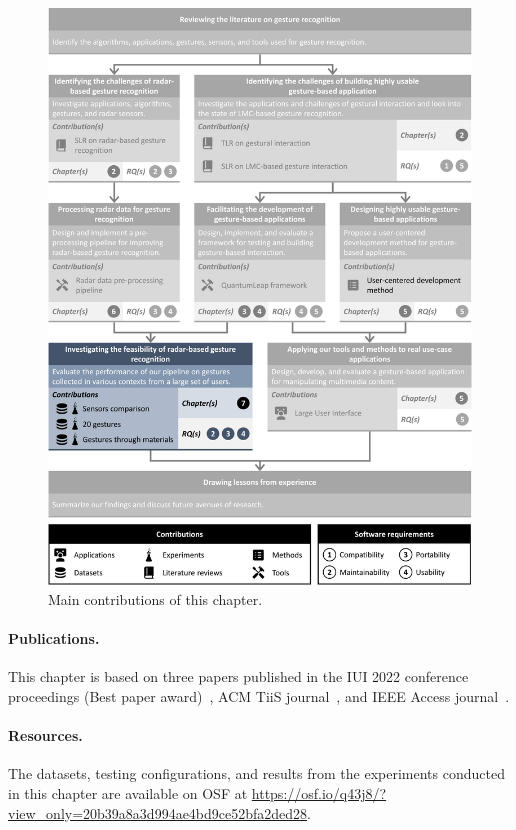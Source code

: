 \begin{figure}
    \centering
    \includegraphics[width=\linewidth]{Figures/RadarExperiments/graphical-summary-radar-experiments.pdf}
    \vspace{-18pt}
    \caption{Main contributions of this chapter.}
    \label{fig:radar-experiments:graphical-summary}
  \end{figure}

\paragraph{Publications.} This chapter is based on three papers published in the IUI 2022 conference proceedings (Best paper award)~\cite{Sluyters:2022:IUI}, ACM TiiS journal~\cite{Sluyters:2023}, and IEEE Access journal~\cite{Sluyters:2024}.

\paragraph{Resources.} The datasets, testing configurations, and results from the experiments conducted in this chapter are available on OSF at \url{https://osf.io/q43j8/?view_only=20b39a8a3d994ae4bd9ce52bfa2ded28}.


